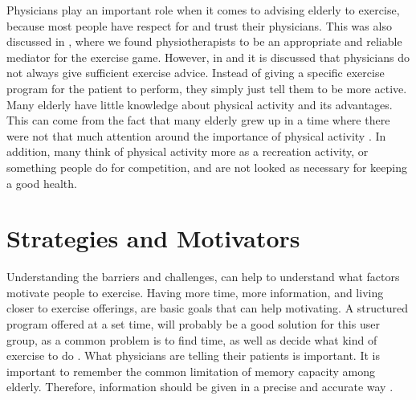 Physicians play an important role when it comes to advising elderly to exercise, because most people have respect for and trust their physicians. This was also discussed in \cite{project}, where we found physiotherapists to be an appropriate and reliable mediator for the exercise game. However, in \cite{schutzer} and \cite{chao} it is discussed that physicians do not always give sufficient exercise advice. Instead of giving a specific exercise program for the patient to perform, they simply just tell them to be more active. Many elderly have little knowledge about physical activity and its advantages. This can come from the fact that many elderly grew up in a time where there were not that much attention around the importance of physical activity \cite{schutzer}. In addition, many think of physical activity more as a recreation activity, or something people do for competition, and are not looked as necessary for keeping a good health.  

\section{Strategies and Motivators}
\label{sec:motivators}
Understanding the barriers and challenges, can help to understand what factors motivate people to exercise. Having more time, more information, and living closer to exercise offerings, are basic goals that can help motivating.  A structured program offered at a set time, will probably be a good solution for this user group, as a common problem is to find time, as well as decide what kind of exercise to do \cite{chao}. What physicians are telling their patients is important. It is important to remember the common limitation of memory capacity among elderly. Therefore, information should be given in a precise and accurate way \cite{chao}.  

